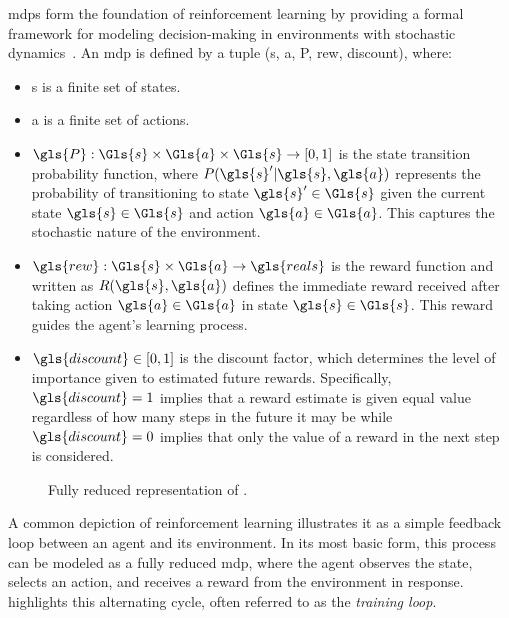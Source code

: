\Glspl{mdp} form the foundation of reinforcement learning by providing 
a formal framework for modeling decision-making in environments with 
stochastic dynamics~\cite{puterman2005}. An \gls{mdp} is defined by a tuple 
(\Gls{s}, \Gls{a}, \gls{P}, \gls{rew}, \gls{discount}), where:
\begin{itemize}
    \item \Gls{s} is a finite set of states.
    \item \Gls{a} is a finite set of actions.
    \item \(\gls{P}: \Gls{s} \times \Gls{a} \times \Gls{s} \rightarrow [0,1]\) is the state 
        transition probability function, where \(P(\gls{s}^\prime|\gls{s}, \gls{a})\) 
        represents the probability of transitioning to state \(\gls{s}^\prime\in \Gls{s}\)
        given the current state \(\gls{s}\in \Gls{s}\) and action \(\gls{a}\in \Gls{a}\).
        This captures the stochastic nature of the environment.
    \item \(\gls{rew}: \Gls{s} \times \Gls{a} \rightarrow \gls{reals}\) is the reward 
        function and written as \(R(\gls{s}, \gls{a})\) defines the immediate reward 
        received after taking action \(\gls{a}\in \Gls{a}\) in state \(\gls{s}\in \Gls{s}\). 
        This reward guides the agent's learning process.
    \item \(\gls{discount} \in [0, 1]\) is the discount factor, which 
        determines the level of importance given to estimated future rewards. 
        Specifically, \(\gls{discount}=1\) implies that a reward estimate is 
        given equal value regardless of how many steps in the future it may 
        be while \(\gls{discount}=0\) implies that only the value of a 
        reward in the next step is considered.
\end{itemize}

\begin{figure}
    \centering
    
    \caption{Fully reduced  
        representation of .}
    \label{fig:mdp_cycle}
\end{figure}

A common depiction of reinforcement learning illustrates it as a simple 
feedback loop between an agent and its environment. In its most basic form, 
this process can be modeled as a fully reduced \gls{mdp}, where the agent observes
the state, selects an action, and receives a reward from the environment in response. 
 highlights this alternating cycle, often referred to as the 
\emph{training loop}.

